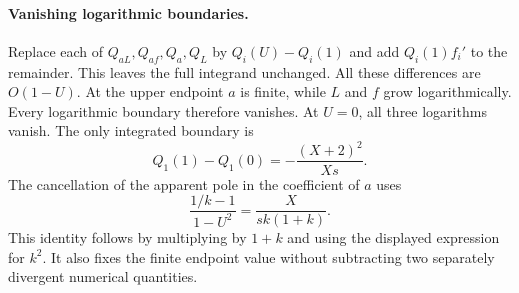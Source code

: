 \paragraph{Vanishing logarithmic boundaries.} Replace each of
$Q_{aL},Q_{af},Q_a,Q_L$ by $Q_i(U)-Q_i(1)$ and add
$Q_i(1)f_i'$ to the remainder. This leaves the full integrand unchanged.
All these differences are $O(1-U)$. At the upper endpoint $a$ is finite,
while $L$ and $f$ grow logarithmically. Every logarithmic boundary
therefore vanishes. At $U=0$, all three logarithms vanish. The only
integrated boundary is
\begin{equation}
 Q_1(1)-Q_1(0)=-\frac{(X+2)^2}{Xs}.
\end{equation}
The cancellation of the apparent pole in the coefficient of $a$ uses
\begin{equation}
 \frac{1/k-1}{1-U^2}=\frac{X}{sk(1+k)}.
\end{equation}
This identity follows by multiplying by $1+k$ and using the displayed
expression for $k^2$. It also fixes the finite endpoint value without
subtracting two separately divergent numerical quantities.

